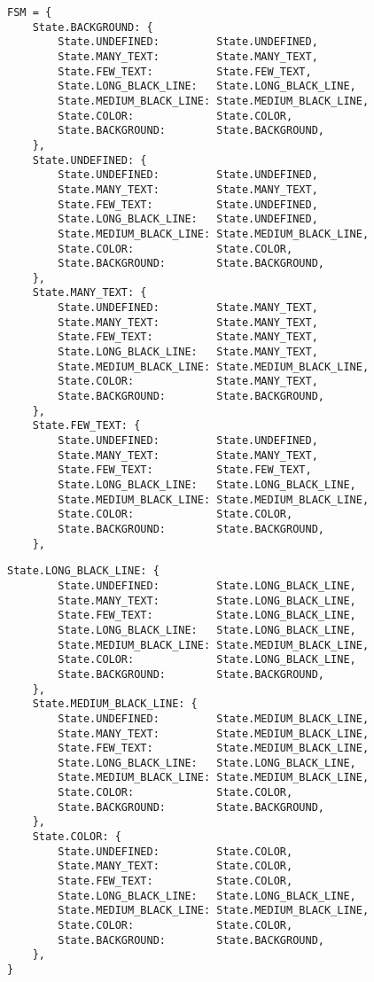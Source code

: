\begin{lstlisting}[caption={Конечный автомат (часть 1)}, label={lst:fsm}]
FSM = {
    State.BACKGROUND: {
        State.UNDEFINED:         State.UNDEFINED,
        State.MANY_TEXT:         State.MANY_TEXT,
        State.FEW_TEXT:          State.FEW_TEXT,
        State.LONG_BLACK_LINE:   State.LONG_BLACK_LINE,
        State.MEDIUM_BLACK_LINE: State.MEDIUM_BLACK_LINE,
        State.COLOR:             State.COLOR,
        State.BACKGROUND:        State.BACKGROUND,
    },
    State.UNDEFINED: {
        State.UNDEFINED:         State.UNDEFINED,
        State.MANY_TEXT:         State.MANY_TEXT,
        State.FEW_TEXT:          State.UNDEFINED,
        State.LONG_BLACK_LINE:   State.UNDEFINED,
        State.MEDIUM_BLACK_LINE: State.MEDIUM_BLACK_LINE,
        State.COLOR:             State.COLOR,
        State.BACKGROUND:        State.BACKGROUND,
    },
    State.MANY_TEXT: {
        State.UNDEFINED:         State.MANY_TEXT,
        State.MANY_TEXT:         State.MANY_TEXT,
        State.FEW_TEXT:          State.MANY_TEXT,
        State.LONG_BLACK_LINE:   State.MANY_TEXT,
        State.MEDIUM_BLACK_LINE: State.MEDIUM_BLACK_LINE,
        State.COLOR:             State.MANY_TEXT,
        State.BACKGROUND:        State.BACKGROUND,
    },
    State.FEW_TEXT: {
        State.UNDEFINED:         State.UNDEFINED,
        State.MANY_TEXT:         State.MANY_TEXT,
        State.FEW_TEXT:          State.FEW_TEXT,
        State.LONG_BLACK_LINE:   State.LONG_BLACK_LINE,
        State.MEDIUM_BLACK_LINE: State.MEDIUM_BLACK_LINE,
        State.COLOR:             State.COLOR,
        State.BACKGROUND:        State.BACKGROUND,
    },
\end{lstlisting}

\newpage

\begin{lstlisting}[caption={Конечный автомат (часть 2)}, label={lst:}]
    State.LONG_BLACK_LINE: {
        State.UNDEFINED:         State.LONG_BLACK_LINE,
        State.MANY_TEXT:         State.LONG_BLACK_LINE,
        State.FEW_TEXT:          State.LONG_BLACK_LINE,
        State.LONG_BLACK_LINE:   State.LONG_BLACK_LINE,
        State.MEDIUM_BLACK_LINE: State.MEDIUM_BLACK_LINE,
        State.COLOR:             State.LONG_BLACK_LINE,
        State.BACKGROUND:        State.BACKGROUND,
    },
    State.MEDIUM_BLACK_LINE: {
        State.UNDEFINED:         State.MEDIUM_BLACK_LINE,
        State.MANY_TEXT:         State.MEDIUM_BLACK_LINE,
        State.FEW_TEXT:          State.MEDIUM_BLACK_LINE,
        State.LONG_BLACK_LINE:   State.LONG_BLACK_LINE,
        State.MEDIUM_BLACK_LINE: State.MEDIUM_BLACK_LINE,
        State.COLOR:             State.COLOR,
        State.BACKGROUND:        State.BACKGROUND,
    },
    State.COLOR: {
        State.UNDEFINED:         State.COLOR,
        State.MANY_TEXT:         State.COLOR,
        State.FEW_TEXT:          State.COLOR,
        State.LONG_BLACK_LINE:   State.LONG_BLACK_LINE,
        State.MEDIUM_BLACK_LINE: State.MEDIUM_BLACK_LINE,
        State.COLOR:             State.COLOR,
        State.BACKGROUND:        State.BACKGROUND,
    },
}
\end{lstlisting}

